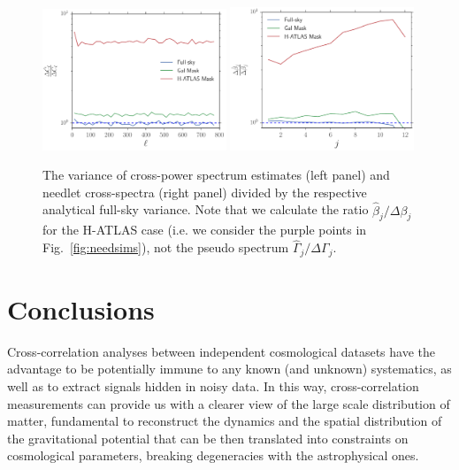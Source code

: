 \documentclass[a4paper,11pt]{article}
\begin{document}
\begin{figure}[tbp]
\centering %
\includegraphics[width=0.49\textwidth]{images/variance_ratio_cl.pdf}
\includegraphics[width=0.49\textwidth]{images/variance_ratio_needlet.pdf}
\caption{\label{fig:var_ratio} The variance of cross-power spectrum estimates (left panel) and needlet 
cross-spectra (right panel) divided by the respective analytical full-sky variance. Note that we calculate the 
ratio  $\hat{\beta}_j/\Delta\beta_j$ for the H-ATLAS case (i.e. we consider the purple points in Fig.~\ref{fig:needsims}), not the pseudo spectrum $\hat{\Gamma}_j/\Delta
\Gamma_j$.}
\end{figure}
%

\section{Conclusions}
\label{sec:conclusion}
Cross-correlation analyses between independent cosmological datasets have the advantage to be 
potentially immune to any known (and unknown) systematics, as well as to extract signals hidden in noisy
data. In this way, cross-correlation measurements can provide us with a clearer view of the large scale 
distribution of matter, fundamental to reconstruct the dynamics and the spatial distribution of the 
gravitational potential that can be then translated into constraints on cosmological parameters, breaking
degeneracies with the astrophysical ones.
\end{document}
